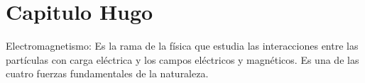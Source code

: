 \section{Capitulo Hugo}
Electromagnetismo: Es la rama de la física que estudia las interacciones entre las partículas con carga eléctrica y los campos eléctricos y magnéticos. Es una de las cuatro fuerzas fundamentales de la naturaleza.